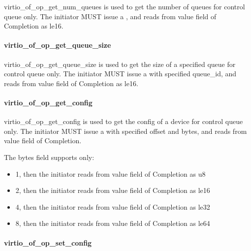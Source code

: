 virtio_of_op_get_num_queues is used to get the number of queues for control queue only.
The initiator MUST issue a ,
and reads from value field of Completion as le16.

\paragraph{virtio_of_op_get_queue_size}\label{sec:Virtio Transport Options / Virtio Over Fabrics / Transmission Protocol / Opcodes Definition / virtio_of_op_get_queue_size}

virtio_of_op_get_queue_size is used to get the size of a specified queue for control queue only.
The initiator MUST issue a  with specified queue_id,
and reads from value field of Completion as le16.

\paragraph{virtio_of_op_get_config}\label{sec:Virtio Transport Options / Virtio Over Fabrics / Transmission Protocol / Opcodes Definition / virtio_of_op_get_config}

virtio_of_op_get_config is used to get the config of a device for control queue only.
The initiator MUST issue a  with specified offset and bytes,
and reads from value field of Completion.

The bytes field supports only:

\begin{itemize}
\item 1, then the initiator reads from value field of Completion as u8
\item 2, then the initiator reads from value field of Completion as le16
\item 4, then the initiator reads from value field of Completion as le32
\item 8, then the initiator reads from value field of Completion as le64
\end{itemize}

\paragraph{virtio_of_op_set_config}\label{sec:Virtio Transport Options / Virtio Over Fabrics / Transmission Protocol / Opcodes Definition / virtio_of_op_set_config}

